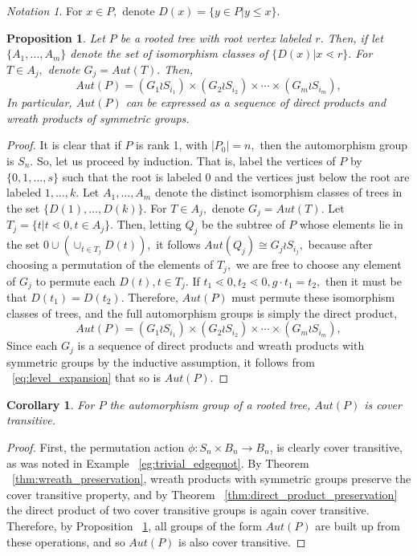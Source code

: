 \documentclass{amsart}
\newtheorem{cor}[thm]{Corollary}
\newtheorem{prop}[thm]{Proposition}
\theoremstyle{remark}
\newtheorem{note}[thm]{Notation}
\begin{document}
\begin{note}
For $x \in P,$ denote $D(x) = \{y \in P| y \leq x\}.$
\end{note}
\begin{prop}
\label{prop:automorphism_trees}
Let $P$ be a rooted tree with root vertex labeled $r$. Then, if let $\{A_1,\ldots,A_m\}$ denote the set of isomorphism classes of $\{D(x)|x\lessdot r\}.$ For $T \in A_j,$ denote $G_j = Aut(T).$ Then, 
\begin{equation}
\label{eq:level_expansion}
Aut(P) = (G_1 \wr S_{i_1}) \times (G_2 \wr S_{i_2}) \times \cdots \times (G_m\wr S_{i_m}),
\end{equation}
In particular, $Aut(P)$ can be expressed as a sequence of direct products and wreath products of symmetric groups.
\end{prop}

\begin{proof}
It is clear that if $P$ is rank 1, with $|P_0| = n,$ then the automorphism group is $S_n.$ So, let us proceed by induction. That is, label the vertices of $P$ by $\{0,1,\ldots, s\}$ such that the root is labeled $0$ and the vertices just below the root are labeled $1, \ldots, k.$ Let $A_1,\ldots, A_m$ denote the distinct isomorphism classes of trees in the set $\{D(1),\ldots, D(k)\}.$ For $T \in A_j,$ denote $G_j = Aut(T).$ 
Let $T_j = \{t|t\lessdot 0,t \in A_j\}.$ Then, letting $Q_j$ be the subtree of $P$ whose elements lie in the set $0 \cup (\cup_{t \in T_j} D(t)),$ it follows $Aut(Q_j) \cong G_j \wr S_{i_j},$ because after choosing a permutation of the elements of $T_j,$ we are free to choose any element of $G_j$ to permute each $D(t),t \in T_j$. If $t_1 \lessdot 0,t_2 \lessdot 0,g \cdot t_1 = t_2,$ then it must be that $D(t_1) = D(t_2).$ Therefore, $Aut(P)$ must permute these isomorphism classes of trees, and the full automorphism groups is simply the direct product, 
\begin{equation}
\label{eq:level_expansion}
Aut(P) = (G_1 \wr S_{i_1}) \times (G_2 \wr S_{i_2}) \times \cdots \times (G_m\wr S_{i_m}),
\end{equation}
Since each $G_j$ is a sequence of direct products and wreath products with symmetric groups by the inductive assumption, it follows from ~\eqref{eq:level_expansion} that so is $Aut(P).$
\end{proof}

\begin{cor}
For $P$ the automorphism group of a rooted tree, $Aut(P)$ is cover transitive.
\end{cor}
\begin{proof}
First, the permutation action $\phi:S_n \times B_n \rightarrow B_n$, is clearly cover transitive, as was noted in Example ~\ref{eg:trivial_edgequot}. By Theorem ~\ref{thm:wreath_preservation}, wreath products with symmetric groups preserve the cover transitive property, and by Theorem ~\ref{thm:direct_product_preservation} the direct product of two cover transitive groups is again cover transitive. Therefore, by Proposition ~\ref{prop:automorphism_trees}, all groups of the form $Aut(P)$ are built up from these operations, and so $Aut(P)$ is also cover transitive.
\end{proof}
\end{document}
